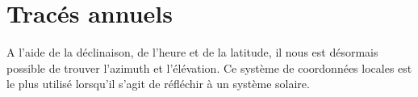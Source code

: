 \documentclass[letterpaper,10pt,english]{sphinxmanual}
\begin{document}
\begin{sphinxVerbatim}[commandchars=\\\{\}]
 
     
\end{sphinxVerbatim}


\section{Tracés annuels}
\label{\detokenize{Part3/EmplacementSoleil:traces-annuels}}
A l’aide de la déclinaison, de l’heure et de la latitude, il nous est désormais possible de trouver l’azimuth et l’élévation. Ce système de coordonnées locales est le plus utilisé lorsqu’il s’agit de réfléchir à un système solaire.
\end{document}
